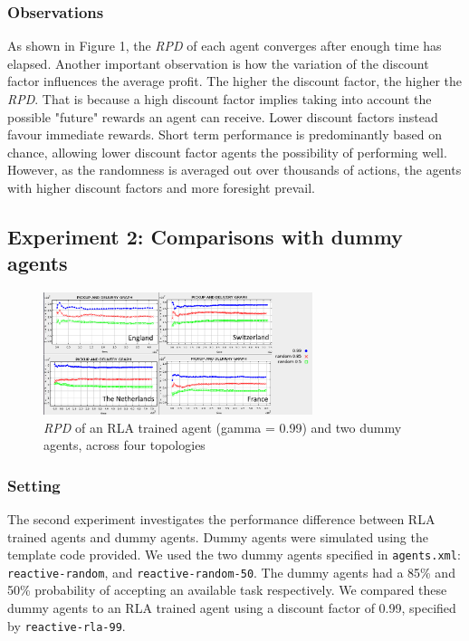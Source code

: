 \documentclass[11pt]{article}
\begin{document}
\subsubsection{Observations}
As shown in Figure 1, the \textit{RPD} of each agent converges after enough time has elapsed. Another important observation is how the variation of the discount factor influences the average profit. The higher the discount factor, the higher the \textit{RPD}. That is because a high discount factor implies taking into account the possible "future" rewards an agent can receive. Lower discount factors instead favour immediate rewards. Short term performance is predominantly based on chance, allowing lower discount factor agents the possibility of performing well. However, as the randomness is averaged out over thousands of actions, the agents with higher discount factors and more foresight prevail.\\

\subsection{Experiment 2: Comparisons with dummy agents}
\begin{figure}
	\centering
	\includegraphics[width=0.7\textwidth]{ex2}
	\caption{\textit{RPD} of an RLA trained agent (gamma = 0.99) and two dummy agents, across four topologies}
	\label{figure:1}
\end{figure}
\subsubsection{Setting}
The second experiment investigates the performance difference between RLA trained agents and dummy agents. Dummy agents were simulated using the template code provided. We used the two dummy agents specified in \texttt{agents.xml}: \texttt{reactive-random}, and \texttt{reactive-random-50}. The dummy agents had a 85\% and 50\% probability of accepting an available task respectively. We compared these dummy agents to an RLA trained agent using a discount factor of 0.99, specified by \texttt{reactive-rla-99}.\\
\\
\\
\end{document}
